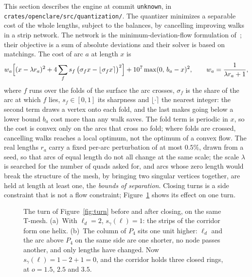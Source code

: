 \documentclass[11pt,a4paper]{article}
\newcommand{\shift}{s}
\providecommand{\enginecommit}{unknown}
\begin{document}
This section describes the engine at commit \texttt{\enginecommit}, in
\nolinkurl{crates/openclare/src/quantization/}. The quantizer minimizes a
separable cost of the whole lengths, subject to the balances, by cancelling
improving walks in a strip network. The network is the minimum-deviation-flow
formulation of~\cite{heistermann2023bimdf}; their objective is a sum of
absolute deviations and their solver is based on matchings. The cost of arc
$a$ at length $x$ is
\[
  w_a \Bigl[(x - \lambda r_a)^2 + 4 \sum_f s_f\, \bigl(\sigma_f x - \lfloor
  \sigma_f x \rceil\bigr)^2\Bigr] + 10^7 \max(0,\, b_a - x)^2,
  \qquad w_a = \frac{1}{\lambda r_a + 1},
\]
where $f$ runs over the folds of the surface the arc crosses, $\sigma_f$ is
the share of the arc at which $f$ lies, $s_f \in [0, 1]$ its sharpness and
$\lfloor \cdot \rceil$ the nearest integer: the second term draws a vertex
onto each fold, and the last makes going below a lower bound $b_a$ cost more
than any walk saves. The fold term is periodic in $x$, so the cost is convex
only on the arcs that cross no fold; where folds are crossed, cancelling walks
reaches a local optimum, not the optimum of a convex flow. The real lengths $r_a$ carry a fixed per-arc
perturbation of at most $0.5\%$, drawn from a seed, so that arcs of equal length do not all
change at the same scale; the scale $\lambda$ is searched for the number of
quads asked for, and arcs whose zero length would break the structure of the
mesh, by bringing two singular vertices together, are held at length at
least one, the \emph{bounds of separation}. Closing turns is a side constraint that is not a
flow constraint; Figure~\ref{fig:closing} shows its effect on one turn.

\begin{figure}[t]
\centering

\caption{The turn of Figure~\ref{fig:turn} before and after closing, on the
same T-mesh. (a)~With $\ell_d = 2$, $\shift_\gamma(\ell) = 1$: the strips of
the corridor form one helix. (b)~The column of $P_4$ sits one unit higher:
$\ell_d$ and the arc above $P_4$ on the same side are one shorter, no node
passes another, and only lengths have changed. Now $\shift_\gamma(\ell) = 1 -
2 + 1 = 0$, and the corridor holds three closed rings, at $o = 1.5$, $2.5$
and $3.5$.}
\label{fig:closing}
\end{figure}
\end{document}
